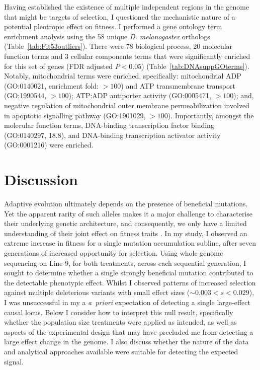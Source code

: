 Having established the existence of multiple independent regions in the genome that might be targets of selection, I questioned the mechanistic nature of a potential pleotropic effect on fitness. I performed a gene ontology term enrichment analysis using the 58 unique \textit{D. melanogaster} orthologs (Table~\ref{tab:Fit53outliers}). There were 78 biological process, 20 molecular function terms and 3 cellular components terms that were significantly enriched for this set of genes (FDR adjusted $P < 0.05$) (Table~\ref{tab:DNAsuppGOterms}). Notably, mitochondrial terms were enriched, specifically: mitochondrial ADP (GO:0140021, enrichment fold: $>100$) and ATP transmembrane transport (GO:1990544, $>100$); ATP:ADP antiporter activity (GO:0005471, $>100$); and, negative regulation of mitochondrial outer membrane permeabilization involved in apoptotic signalling pathway (GO:1901029, $>100$). Importantly, amongst the molecular function terms, DNA-binding transcription factor binding (GO:0140297, 18.8), and DNA-binding transcription activator activity (GO:0001216) were enriched. \par

\section{Discussion}
Adaptive evolution ultimately depends on the presence of beneficial mutations. Yet the apparent rarity of such alleles makes it a major challenge to characterise their underlying genetic architecture, and consequently, we only have a limited understanding of their joint effect on fitness traits \citep{Eyre07, Wals18}. In my study, I observed an extreme increase in fitness for a single mutation accumulation subline, after seven generations of increased opportunity for selection. Using whole-genome sequencing on Line 9, for both treatments, across each sequential generation, I sought to determine whether a single strongly beneficial mutation contributed to the detectable phenotypic effect. Whilst I observed patterns of increased selection against multiple deleterious variants with small effect sizes ($\sim 0.003 < s < 0.029$), I was unsuccessful in my a \textit{a~priori} expectation of detecting a single large-effect causal locus. Below I consider how to interpret this null result, specifically whether the population size treatments were applied as intended, as well as aspects of the experimental design that may have precluded me from detecting a large effect change in the genome. I also discuss whether the nature of the data and analytical approaches available were suitable for detecting the expected signal.\par

